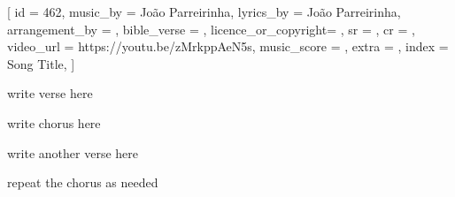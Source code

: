[
    id                  = {462},
    music_by            = {João Parreirinha}, %
    lyrics_by           = {João Parreirinha}, %
    arrangement_by      = {}, %
    bible_verse         = {},
    licence_or_copyright= {},
    sr                  = {},
    cr                  = {},
    video_url           = {https://youtu.be/zMrkppAeN5s}, 
    music_score         = {}, %
    extra               = {},
    index               = {Song Title},
]

\beginverse
write verse here
\endverse

\beginchorus
write chorus here
\endchorus

\beginverse
write another verse here
\endverse

\beginchorus
repeat the chorus as needed
\endchorus

\endsong
